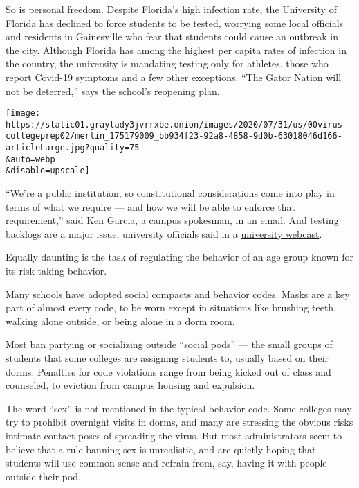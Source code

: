 So is personal freedom. Despite Florida's high infection rate, the
University of Florida has declined to force students to be tested,
worrying some local officials and residents in Gainesville who fear that
students could cause an outbreak in the city. Although Florida has among
\href{https://www.nytimes3xbfgragh.onion/interactive/2020/us/coronavirus-us-cases.html}{the
highest per capita} rates of infection in the country, the university is
mandating testing only for athletes, those who report Covid-19 symptoms
and a few other exceptions. ``The Gator Nation will not be deterred,''
says the school's
\href{https://coronavirus.ufl.edu/media/coronavirusufledu/Reopening-Plan.pdf}{reopening
plan}.

\texttt{[image: https://static01.graylady3jvrrxbe.onion/images/2020/07/31/us/00virus-collegeprep02/merlin\_175179009\_bb934f23-92a8-4858-9d0b-63018046d166-articleLarge.jpg?quality=75\\\&auto=webp\\\&disable=upscale]}

``We're a public institution, so constitutional considerations come into
play in terms of what we require --- and how we will be able to enforce
that requirement,'' said Ken Garcia, a campus spokesman, in an email.
And testing backlogs are a major issue, university officials said in a
\href{https://mediasite.video.ufl.edu/Mediasite/Play/175687a86d7f49069f03f9e60e3ed70b1d}{university
webcast}.

Equally daunting is the task of regulating the behavior of an age group
known for its risk-taking behavior.

Many schools have adopted social compacts and behavior codes. Masks are
a key part of almost every code, to be worn except in situations like
brushing teeth, walking alone outside, or being alone in a dorm room.

Most ban partying or socializing outside ``social pods'' --- the small
groups of students that some colleges are assigning students to, usually
based on their dorms. Penalties for code violations range from being
kicked out of class and counseled, to eviction from campus housing and
expulsion.

The word ``sex'' is not mentioned in the typical behavior code. Some
colleges may try to prohibit overnight visits in dorms, and many are
stressing the obvious risks intimate contact poses of spreading the
virus. But most administrators seem to believe that a rule banning sex
is unrealistic, and are quietly hoping that students will use common
sense and refrain from, say, having it with people outside their pod.

